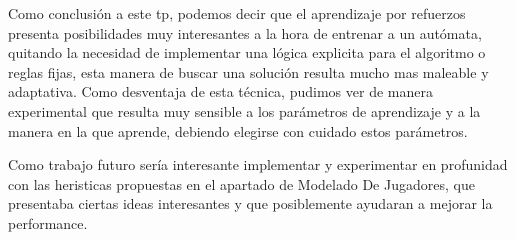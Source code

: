 Como conclusión a este tp, podemos decir que el aprendizaje por refuerzos presenta posibilidades muy interesantes a la hora de entrenar a un autómata, quitando la necesidad de implementar una lógica explicita para el algoritmo o reglas fijas, esta manera de buscar una solución resulta mucho mas maleable y adaptativa. Como desventaja de esta técnica, pudimos ver de manera experimental que resulta muy sensible a los parámetros de aprendizaje y a la manera en la que aprende, debiendo elegirse con cuidado estos parámetros.

Como trabajo futuro sería interesante implementar y experimentar en profunidad con las heristicas propuestas en el apartado de Modelado De Jugadores, que presentaba ciertas ideas interesantes y que posiblemente ayudaran a mejorar la performance.